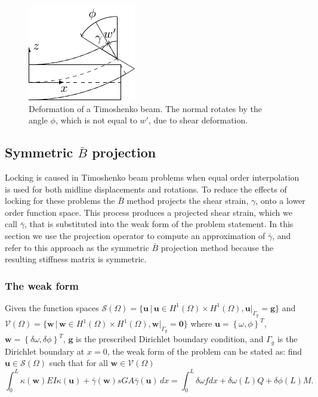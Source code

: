 \begin{figure}[ht]
    \centering
    \includegraphics[width=0.25\linewidth]{timoshenko_beam_shape}
    \caption{Deformation of a Timoshenko beam. The normal rotates by the angle $\phi$, which is not equal to $w'$, due to shear deformation.}
    \label{fig:Timoshenko_beam_cross}
\end{figure}

\subsection{Symmetric \Bezier $\bar{B}$ projection}
\label{sec:symmetric-projection}
Locking is caused in Timoshenko beam problems when equal order interpolation is used for both midline displacements and rotations. To reduce the effects of locking for these problems the $\bar{B}$ method projects the shear strain, $\gamma$, onto a lower order function space. This process produces a projected shear strain, which we call $\bar{\gamma}$,  that is substituted into the weak form of the problem statement. In this section we use the \Bezier projection operator to compute an approximation of $\bar{\gamma}$, and refer to this approach as the symmetric \Bezier $\bar{B}$ projection method because the resulting stiffness matrix is symmetric.

\subsubsection{The weak form}

\sloppy Given the function spaces $\mathcal{S}(\Omega)=\{{\mathbf{u} \, \vert \, {\mathbf{u}\in{H^1(\Omega)\times{H^1(\Omega)}}},\mathbf{u}\vert_{\Gamma_{g}}=\mathbf{g}}\}$ and $\mathcal{V}(\Omega)=\{{\mathbf{w} \, \vert \, {\mathbf{w}\in{H^1(\Omega)\times{H^1(\Omega)}}}, \allowbreak \mathbf{w}\vert_{\Gamma_{g}}=\mathbf{0}}\}$ where $\mathbf{u}=\left\{{\omega,\phi}\right\}^T$, $\mathbf{w}=\left\{{\delta\omega,\delta\phi}\right\}^T$, $\mathbf{g}$ is the prescribed Dirichlet boundary condition, and $\Gamma_g$ is the Dirichlet boundary at $x=0$, the weak form of the problem can be stated as: find $\mathbf{u}\in{\mathcal{S}(\Omega)}$ such that for all $\mathbf{w}\in{\mathcal{V}(\Omega)}$
\begin{equation}
    {\int_{0}^L\kappa(\mathbf{w})EI\kappa(\mathbf{u}) + \bar{\gamma}(\mathbf{w})sGA\bar{\gamma}(\mathbf{u})} \, dx=\int_0^L\delta\omega f dx+\delta\omega(L)Q+\delta\phi(L)M.
\end{equation}


